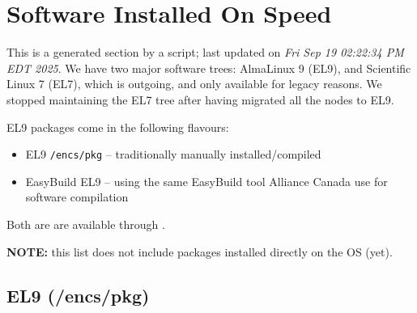 \section{Software Installed On Speed}
\label{sect:software-list}

This is a generated section by a script; last updated on \textit{Fri Sep 19 02:22:34 PM EDT 2025}.
We have two major software trees:
AlmaLinux 9 (EL9), and
Scientific Linux 7 (EL7), which is outgoing, and only available for legacy reasons.
We stopped maintaining the EL7 tree after
having migrated all the nodes to EL9.

EL9 packages come in the following flavours:
%
\begin{itemize}
\item
EL9 \texttt{/encs/pkg} -- traditionally manually installed/compiled
\item
EasyBuild EL9 -- using the same EasyBuild tool Alliance Canada use for software compilation
\end{itemize}
%
Both are are available through .

\noindent
\textbf{NOTE:} this list does not include packages installed directly on the OS (yet).
\subsection{EL9 (/encs/pkg)}
\label{sect:software-el9}

